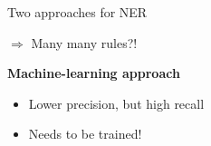 \documentclass[xcolor=x11names, aspectratio=169,usenames,dvipsnames]{beamer}
\begin{document}
\begin{frame}{Two approaches for NER}
\begin{minipage}[t]{0.45\textwidth}
\begin{itemize}
$\Rightarrow$ \alert{Many many rules?!}
\end{itemize}
\end{minipage}\pause\pause\hfill
\begin{minipage}[t]{0.45\textwidth}
\textbf{Machine-learning approach}
\begin{itemize}
\item Lower precision, but high recall
\item \alert{Needs to be trained!}
\end{itemize}%
\end{minipage}
\end{frame}
\end{document}
